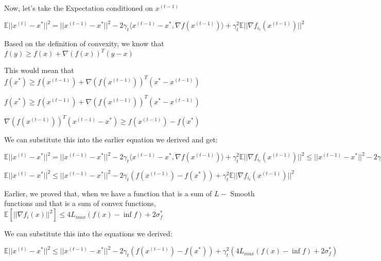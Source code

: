 Now, let's take the Expectation conditioned on $x^{(t - 1)}$ \newline 

$\mathbb{E}||x^{(t)} - x^*||^2 = ||x^{(t - 1)} - x^*||^2 - 2\gamma_t \langle x^{(t - 1)} - x^*,  \nabla f(x^{(t - 1)})\rangle + \gamma_t^2 \mathbb{E}||\nabla f_{i_t}(x^{(t - 1)})||^2$ \newline 

Based on the definition of convexity, we know that $f(y) \geq f(x) + \nabla(f(x))^T (y - x)$ \newline 

This would mean that $f(x^*) \geq f(x^{(t - 1)}) + \nabla(f(x^{(t - 1)}))^T (x^* - x^{(t - 1)})$ \newline 


$f(x^*) \geq f(x^{(t - 1)}) + \nabla(f(x^{(t - 1)}))^T (x^* - x^{(t - 1)})$ \newline 


$\nabla(f(x^{(t - 1)}))^T (x^{(t - 1)} - x^*) \geq f(x^{(t - 1)}) - f(x^*)$ \newline 

We can substitute this into the earlier equation we derived and get: \newline 

$\mathbb{E}||x^{(t)} - x^*||^2 = ||x^{(t - 1)} - x^*||^2 - 2\gamma_t \langle x^{(t - 1)} - x^*,  \nabla f(x^{(t - 1)})\rangle + \gamma_t^2 \mathbb{E}||\nabla f_{i_t}(x^{(t - 1)})||^2 \leq ||x^{(t - 1)} - x^*||^2 - 2\gamma_t (f(x^{(t - 1)}) - f(x^*)) + \gamma_t^2 \mathbb{E}||\nabla f_{i_t}(x^{(t - 1)})||^2$ \newline 

$\mathbb{E}||x^{(t)} - x^*||^2 \leq ||x^{(t - 1)} - x^*||^2 - 2\gamma_t (f(x^{(t - 1)}) - f(x^*)) + \gamma_t^2 \mathbb{E}||\nabla f_{i_t}(x^{(t - 1)})||^2$ \newline 


Earlier, we proved that, when we have a function that is a sum of $L-$ Smooth functions and that is a sum of convex functions, $\mathbb{E}[||\nabla f_i(x)||^2] \leq 4L_{max} (f(x) - \inf f) + 2 \sigma_f^*$ \newline 

We can substitute this into the equations we derived: \newline 

$\mathbb{E}||x^{(t)} - x^*||^2 \leq ||x^{(t - 1)} - x^*||^2 - 2\gamma_t (f(x^{(t - 1)}) - f(x^*)) + \gamma_t^2 (4L_{max} (f(x) - \inf f) + 2 \sigma_f^*) $ \newline 

